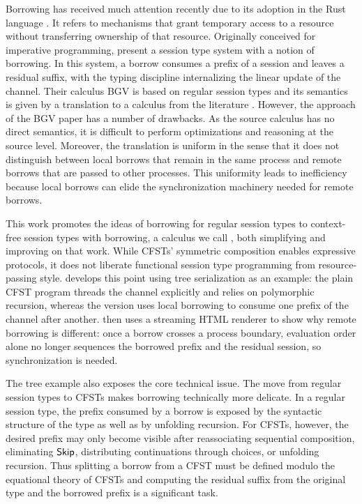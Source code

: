 Borrowing has received much attention recently due to its adoption in
the Rust language \cite{team24:_rust_progr_languag}. It refers to mechanisms that
grant temporary access to a resource without transferring ownership of
that resource. Originally conceived for imperative programming,
\citet{DBLP:journals/pacmpl/SaffrichS0V25} present a session type
system with a notion of borrowing.
In this system, a borrow consumes a prefix of a session and leaves a residual suffix, with the
typing discipline internalizing the linear update of the channel.
Their calculus BGV is based on regular
session types \cite{DBLP:conf/esop/LindleyM15} and its semantics is
given by a translation to a calculus from the literature
\cite{DBLP:journals/lmcs/KokkeD23}. However, the approach of the BGV paper has a number of
drawbacks. As the source calculus has no direct semantics, it is
difficult to perform optimizations and reasoning at the source level. Moreover, the
translation is uniform in the sense that it does not distinguish
between local borrows that remain in the same process and remote
borrows that are passed to other processes. This uniformity leads to
inefficiency because local borrows can elide the synchronization
machinery needed for remote borrows. 

This work promotes the ideas of borrowing for regular session types
\cite{DBLP:journals/pacmpl/SaffrichS0V25} to context-free session
types with borrowing, a calculus we call \thecalculus, both
simplifying and improving on that work. While CFSTs'
symmetric composition enables expressive protocols, it does not
liberate functional session type programming from resource-passing
style.  develops this point using tree
serialization as an example: the plain CFST program
threads the channel explicitly and relies on polymorphic recursion,
whereas the \thecalculus version uses local borrowing to consume one
prefix of the channel after another.  then
uses a streaming HTML renderer to show why remote borrowing is
different: once a borrow crosses a process boundary, evaluation order
alone no longer sequences the borrowed prefix and the residual
session, so synchronization is needed.

The tree example also exposes the core technical issue. The move from regular 
session types to CFSTs makes borrowing technically more delicate. In a
regular session type, the prefix consumed by a borrow is exposed by
the syntactic structure of the type as well as by unfolding
recursion. For CFSTs, however, the desired 
prefix may only become visible after reassociating sequential
composition, eliminating \ensuremath{\CodeTy{Skip}}, distributing continuations
through choices, or unfolding recursion.  Thus splitting a borrow from
a CFST must be defined modulo the equational theory of CFSTs and
computing the residual suffix from the original type and the borrowed
prefix is a significant task.

